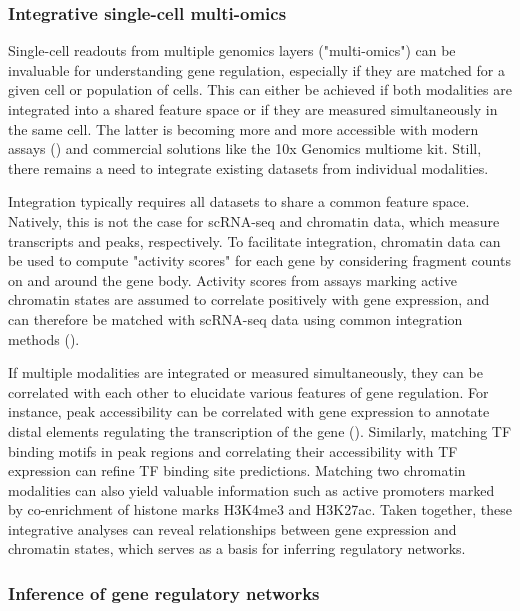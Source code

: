 \subsubsection{Integrative single-cell multi-omics}

Single-cell readouts from multiple genomics layers ("multi-omics") can be invaluable for understanding gene regulation, especially if they are matched for a given cell or population of cells. This can either be achieved if both modalities are integrated into a shared feature space or if they are measured simultaneously in the same cell. The latter is becoming more and more accessible with modern assays (\cite{ma_chromatin_2020,bartosovic_multimodal_2022}) and commercial solutions like the  10x Genomics multiome kit. Still, there remains a need to integrate existing datasets from individual modalities.

Integration typically requires all datasets to share a common feature space. Natively, this is not the case for scRNA-seq and chromatin data, which measure transcripts and peaks, respectively. To facilitate integration, chromatin data can be used to compute "activity scores" for each gene by considering fragment counts on and around the gene body. Activity scores from assays marking active chromatin states are assumed to correlate positively with gene expression, and can therefore be matched with scRNA-seq data using common integration methods (\cite{stuart_comprehensive_2019,luecken_benchmarking_2022}). 

If multiple modalities are integrated or measured simultaneously, they can be correlated with each other to elucidate various features of gene regulation. For instance, peak accessibility can be correlated with gene expression to annotate distal elements regulating the transcription of the gene (\cite{ma_chromatin_2020}). Similarly, matching TF binding motifs in peak regions and correlating their accessibility with TF expression can refine TF binding site predictions. Matching two chromatin modalities can also yield valuable information such as active promoters marked by co-enrichment of histone marks H3K4me3 and H3K27ac. Taken together, these integrative analyses can reveal relationships between gene expression and chromatin states, which serves as a basis for inferring regulatory networks.



\subsubsection{Inference of gene regulatory networks}

